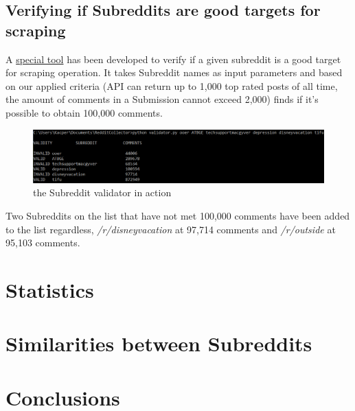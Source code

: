 \documentclass{article}
\begin{document}
\subsection{Verifying if Subreddits are good targets for scraping}

A \href{https://github.com/scrapingredditboys/ScrapingRedditNaturalLanguageProcessingWUT2019/blob/master/reddit-collector/validator.py}{special tool} has been developed to verify if a given subreddit is a good target for scraping operation. It takes Subreddit names as input parameters and based on our applied criteria (API can return up to 1,000 top rated posts of all time, the amount of comments in a Submission cannot exceed 2,000) finds if it's possible to obtain 100,000 comments.

\begin{figure}[htb!]
    \centering
    \includegraphics[width=\textwidth]{validator.png}
    \caption{the Subreddit validator in action}
    \label{fig:mesh1}
\end{figure}
Two Subreddits on the list that have not met 100,000 comments have been added to the list regardless, \textit{/r/disneyvacation} at 97,714 comments and \textit{/r/outside} at 95,103 comments.

\section{Statistics}
\section{Similarities between Subreddits}
\section{Conclusions}
\end{document}
